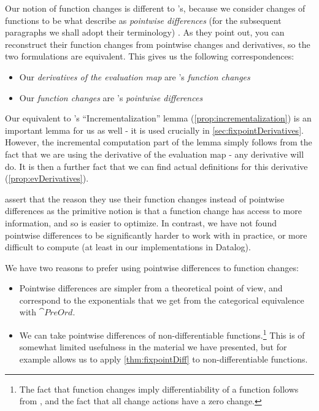 Our notion of function changes is different to \citeauthor{cai2014changes}'s,
because we consider changes of functions to be what \citeauthor{cai2014changes} describe as
\textit{pointwise differences} (for the subsequent paragraphs we shall adopt
their terminology) \autocite[See][section 2.2]{cai2014changes}. As they point out, you can reconstruct their
function changes from pointwise changes and derivatives, so the two formulations
are equivalent. This gives us the following correspondences:
\begin{itemize}
  \item Our \textit{derivatives of the
      evaluation map} are \citeauthor{cai2014changes}'s \textit{function changes}
  \item Our \textit{function changes} are \citeauthor{cai2014changes}'s \textit{pointwise differences}
\end{itemize}

Our equivalent to \citeauthor{cai2014changes}'s ``Incrementalization'' lemma
(\cref{prop:incrementalization}) is an important lemma for us as well - it is used
crucially in \cref{sec:fixpointDerivatives}. However, the incremental computation part of
the lemma simply follows from the fact that we are using the derivative of the
evaluation map - any derivative will do. It is then a further fact that we can
find actual definitions for this derivative (\cref{prop:evDerivatives}).

\citeauthor{cai2014changes} assert that the reason they use their function changes instead of pointwise
differences as the primitive notion is that a function change has access to more
information, and so is easier to optimize. In contrast, we have not found pointwise differences to be
significantly harder to work with in practice, or more difficult to compute (at least in our implementations
in Datalog).

We have two reasons to prefer using pointwise differences to function changes:
\begin{itemize}
  \item Pointwise differences are simpler from a theoretical point of view, and
    correspond to the exponentials that we get from the categorical equivalence with $\cat{PreOrd}$. 
  \item We can take pointwise differences of non-differentiable
    functions.\footnote{The fact that function changes imply differentiability
      of a function follows from \textcite[][Theorem 2.10]{cai2014changes}, and
      the fact that all change actions have a zero change.} This
    is of somewhat limited usefulness in the material we have presented, but for
    example allows us to apply \cref{thm:fixpointDiff} to non-differentiable functions.
\end{itemize}

